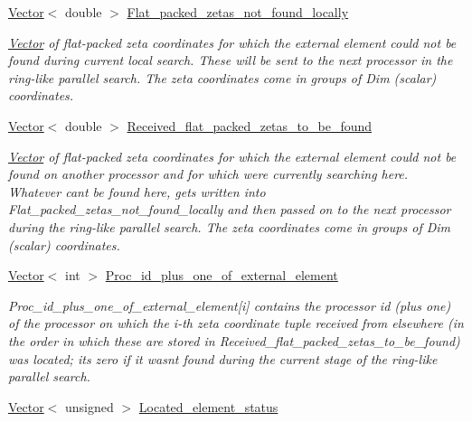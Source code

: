 \begin{DoxyCompactItemize}
\hyperlink{classoomph_1_1Vector}{Vector}$<$ double $>$ \hyperlink{namespaceoomph_1_1Multi__domain__functions_a880374b0f685eeddca0c70b5a5d40a85}{Flat\+\_\+packed\+\_\+zetas\+\_\+not\+\_\+found\+\_\+locally}
\begin{DoxyCompactList}\small\item\em \hyperlink{classoomph_1_1Vector}{Vector} of flat-\/packed zeta coordinates for which the external element could not be found during current local search. These will be sent to the next processor in the ring-\/like parallel search. The zeta coordinates come in groups of Dim (scalar) coordinates. \end{DoxyCompactList}\item 
\hyperlink{classoomph_1_1Vector}{Vector}$<$ double $>$ \hyperlink{namespaceoomph_1_1Multi__domain__functions_aa5bb8d568feb34660caf8f88928f3be7}{Received\+\_\+flat\+\_\+packed\+\_\+zetas\+\_\+to\+\_\+be\+\_\+found}
\begin{DoxyCompactList}\small\item\em \hyperlink{classoomph_1_1Vector}{Vector} of flat-\/packed zeta coordinates for which the external element could not be found on another processor and for which we\textquotesingle{}re currently searching here. Whatever can\textquotesingle{}t be found here, gets written into Flat\+\_\+packed\+\_\+zetas\+\_\+not\+\_\+found\+\_\+locally and then passed on to the next processor during the ring-\/like parallel search. The zeta coordinates come in groups of Dim (scalar) coordinates. \end{DoxyCompactList}\item 
\hyperlink{classoomph_1_1Vector}{Vector}$<$ int $>$ \hyperlink{namespaceoomph_1_1Multi__domain__functions_a05cf6413be5c69ff7535ebf0b8a153e3}{Proc\+\_\+id\+\_\+plus\+\_\+one\+\_\+of\+\_\+external\+\_\+element}
\begin{DoxyCompactList}\small\item\em Proc\+\_\+id\+\_\+plus\+\_\+one\+\_\+of\+\_\+external\+\_\+element\mbox{[}i\mbox{]} contains the processor id (plus one) of the processor on which the i-\/th zeta coordinate tuple received from elsewhere (in the order in which these are stored in Received\+\_\+flat\+\_\+packed\+\_\+zetas\+\_\+to\+\_\+be\+\_\+found) was located; it\textquotesingle{}s zero if it wasn\textquotesingle{}t found during the current stage of the ring-\/like parallel search. \end{DoxyCompactList}\item 
\hyperlink{classoomph_1_1Vector}{Vector}$<$ unsigned $>$ \hyperlink{namespaceoomph_1_1Multi__domain__functions_ae6f22430d0d0df252be95eeda5c03151}{Located\+\_\+element\+\_\+status}

\end{DoxyCompactItemize}
